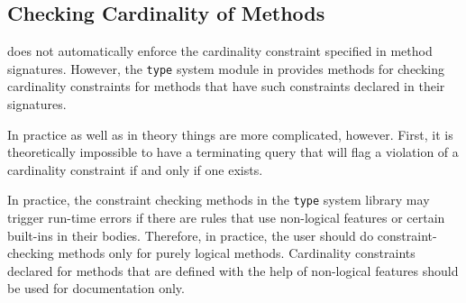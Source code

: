 \documentclass[11pt]{article}
\newcommand{\ERGO}{\mbox{\smaller{\ensuremath{\cal{E}}\smaller{{\sc{RGO}}}}}\xspace}
\newcommand{\FLSYSTEM}{\ERGO}
\begin{document}
\subsection{Checking Cardinality of Methods}\label{sec-cardinality}

\FLSYSTEM does not automatically enforce the cardinality constraint specified
in method signatures.  However, the {\tt type} system module in \FLSYSTEM
provides methods for checking cardinality
constraints for methods that have such constraints declared in their
signatures.

In practice as well as in theory things are more complicated, however.
First, it is theoretically impossible to have a terminating
query that will flag a
violation of a cardinality constraint if and only if one exists.

In practice, the constraint checking methods
in the {\tt type} system library may trigger run-time
errors if there are rules that use non-logical features or certain
built-ins
in their bodies.  Therefore, in practice, the user should do
constraint-checking methods only for purely logical methods. Cardinality
constraints declared for methods that are defined with the help of
non-logical features should be used for documentation only.
\end{document}
